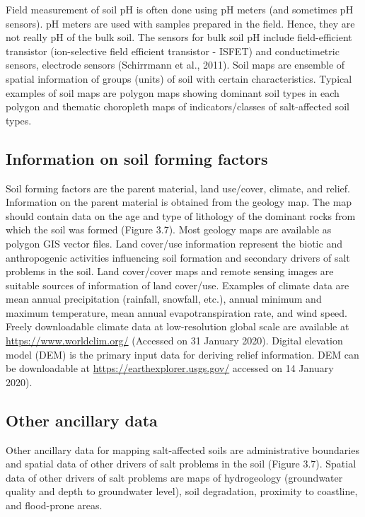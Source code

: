 \documentclass[
  10pt,
  b5paper,
]{book}
\begin{document}
Field measurement of soil pH is often done using pH meters (and sometimes pH sensors). pH meters are used with samples prepared in the field. Hence, they are not really pH of the bulk soil. The sensors for bulk soil pH include field-efficient transistor (ion-selective field efficient transistor - ISFET) and conductimetric sensors, electrode sensors (Schirrmann et al., 2011).
Soil maps are ensemble of spatial information of groups (units) of soil with certain characteristics. Typical examples of soil maps are polygon maps showing dominant soil types in each polygon and thematic choropleth maps of indicators/classes of salt-affected soil types.

\hypertarget{information-on-soil-forming-factors}{%
\subsection{Information on soil forming factors}\label{information-on-soil-forming-factors}}

Soil forming factors are the parent material, land use/cover, climate, and relief. Information on the parent material is obtained from the geology map. The map should contain data on the age and type of lithology of the dominant rocks from which the soil was formed (Figure 3.7). Most geology maps are available as polygon GIS vector files.
Land cover/use information represent the biotic and anthropogenic activities influencing soil formation and secondary drivers of salt problems in the soil. Land cover/cover maps and remote sensing images are suitable sources of information of land cover/use. Examples of climate data are mean annual precipitation (rainfall, snowfall, etc.), annual minimum and maximum temperature, mean annual evapotranspiration rate, and wind speed. Freely downloadable climate data at low-resolution global scale are available at \url{https://www.worldclim.org/} (Accessed on 31 January 2020). Digital elevation model (DEM) is the primary input data for deriving relief information. DEM can be downloadable at \url{https://earthexplorer.usgs.gov/} accessed on 14 January 2020).

\hypertarget{other-ancillary-data}{%
\subsection{Other ancillary data}\label{other-ancillary-data}}

Other ancillary data for mapping salt-affected soils are administrative boundaries and spatial data of other drivers of salt problems in the soil (Figure 3.7). Spatial data of other drivers of salt problems are maps of hydrogeology (groundwater quality and depth to groundwater level), soil degradation, proximity to coastline, and flood-prone areas.
\end{document}
